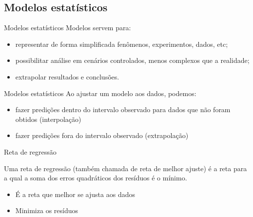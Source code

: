 \documentclass{beamer}
\begin{document}
\subsection{Modelos estatísticos}

\begin{frame}{Modelos estatísticos}
  Modelos servem para:
  \begin{itemize}
  \item representar de forma simplificada fenômenos, experimentos,
    dados, etc;
  \item possibilitar análise em cenários controlados, menos complexos
    que a realidade;
  \item extrapolar resultados e conclusões.
  \end{itemize}
\end{frame}

\begin{frame}{Modelos estatísticos}
  Ao ajustar um modelo aos dados, podemos:
  \begin{itemize}
  \item fazer predições dentro do intervalo observado para dados que
    não foram obtidos (interpolação)
  \item fazer predições fora do intervalo observado (extrapolação)
  \end{itemize}
\end{frame}

\begin{frame}{Reta de regressão}
  \begin{definition}
    Uma \alert{reta de regressão} (também chamada de reta de melhor
    ajuste) é a reta para a qual a soma dos erros quadráticos dos
    resíduos é o mínimo.
  \end{definition}
  \begin{itemize}
  \item É a reta que melhor se ajusta aos dados
  \item Minimiza os resíduos
  \end{itemize}
\end{frame}
\end{document}
